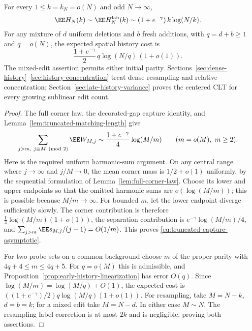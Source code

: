 \documentclass[11pt,letterpaper]{article}
\begin{document}
\begin{theorem}
\label{thm:sharp-sublinear-history}
For every $1\le k=k_N=o(N)$ and odd $N\to\infty$,
\begin{equation}\label{eq:sharp-sublinear-resampling}
 \EE H_N(k)\sim\EE H_N^{\rm lab}(k)
        \sim(1+e^{-\gamma})\,k\log(N/k).
\end{equation}
For any mixture of $d$ uniform deletions and $b$ fresh additions,
with $q=d+b\ge1$ and $q=o(N)$, the expected spatial history cost is
\begin{equation}\label{eq:sharp-sublinear-mixed}
 \frac{1+e^{-\gamma}}2\,q\log(N/q)\,(1+o(1)).
\end{equation}
The mixed-edit assertion permits either initial parity.
Sections~\ref{sec:dense-history}--\ref{sec:history-concentration}
treat dense resampling and relative concentration;
Section~\ref{sec:late-history-variance} proves the centered CLT
for every growing sublinear edit count.
\end{theorem}
\begin{proof}
The full corner law, the decorated-gap capture identity, and
Lemma~\ref{lem:truncated-matching-length} give
\begin{equation}\label{eq:truncated-capture-asymptotic}
 \sum_{j>m,\ j\equiv M\ ({\rm mod}\ 2)}\EE W_{M,j}
       \sim\frac{1+e^{-\gamma}}4\log(M/m)
       \qquad(m=o(M),\ m\ge2).
\end{equation}
Here is the required uniform harmonic-sum argument. On any central
range where $j\to\infty$ and $j/M\to0$, the mean corner mass is
$1/2+o(1)$ uniformly, by the sequential formulation of
Lemma~\ref{lem:full-corner-law}. Choose its lower and upper endpoints
so that the omitted harmonic sums are $o(\log(M/m))$; this is
possible because $M/m\to\infty$. For bounded $m$, let the lower
endpoint diverge sufficiently slowly. The corner contribution is
therefore $\tfrac14\log(M/m)(1+o(1))$, the separation contribution
is $e^{-\gamma}\log(M/m)/4$, and
$\sum_{j>m}\EE s_{M,j}/(j-1)=O(1/m)$.
This proves \eqref{eq:truncated-capture-asymptotic}.

For two probe sets on a common background choose $m$ of the proper
parity with $4q+4\le m\le4q+5$. For $q=o(M)$ this is admissible,
and Proposition~\ref{prop:early-history-linearization} has error
$O(q)$. Since $\log(M/m)=\log(M/q)+O(1)$, the expected cost is
$((1+e^{-\gamma})/2)q\log(M/q)(1+o(1))$.
For resampling, take $M=N-k$, $d=b=k$; for a mixed edit take
$M=N-d$. In either case $M\sim N$. The resampling label correction
is at most $2k$ and is negligible, proving both assertions.
\end{proof}
\end{document}
